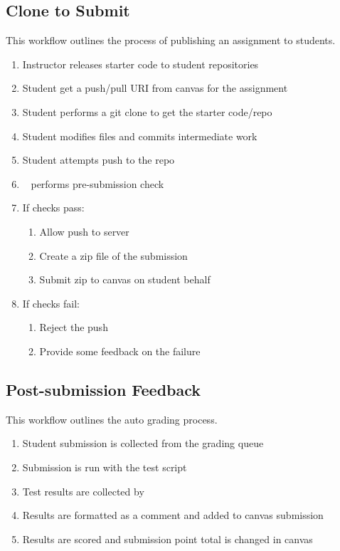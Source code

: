 \subsection{Clone to Submit}
\label{wf_student_submit}
This workflow outlines the process of publishing an assignment to students.
\begin{enumerate}
\item Instructor releases starter code to student repositories
\item Student get a push/pull URI from canvas for the assignment
\item Student performs a git clone to get the starter code/repo
\item Student modifies files and commits intermediate work
\item Student attempts push to the repo
\item \acronym~ performs pre-submission check
\item If checks pass:
    \begin{enumerate}
    \item Allow push to server
    \item Create a zip file of the submission
    \item Submit zip to canvas on student behalf
    \end{enumerate}
\item If checks fail:
    \begin{enumerate}
    \item Reject the push
    \item Provide some feedback on the failure
    \end{enumerate}
\end{enumerate}

\subsection{Post-submission Feedback}
\label{wf_post_submission}
This workflow outlines the auto grading process.
\begin{enumerate}
\item Student submission is collected from the grading queue
\item Submission is run with the test script
\item Test results are collected by \acronym
\item Results are formatted as a comment and added to canvas submission
\item Results are scored and submission point total is changed in canvas
\end{enumerate}